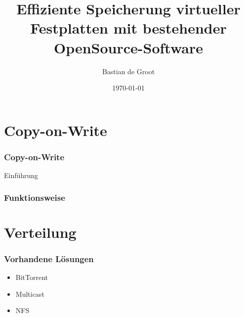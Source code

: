 \documentclass{beamer}
\begin{document}
\title{Effiziente Speicherung virtueller Festplatten mit bestehender OpenSource-Software}  
\author{Bastian de Groot}
\date{\today} 


\begin{frame}
\titlepage
\end{frame} 

\section{Copy-on-Write}
\begin{frame}
\frametitle{Copy-on-Write} 
Einführung
\end{frame}

\begin{frame}
\frametitle{Funktionsweise} 

\end{frame}

\section{Verteilung}

\begin{frame}
\frametitle{Vorhandene Lösungen} 
\begin{itemize}

 \item BitTorrent
 \item Multicast
 \item NFS
 
\end{itemize}
\end{frame}
\end{document}
